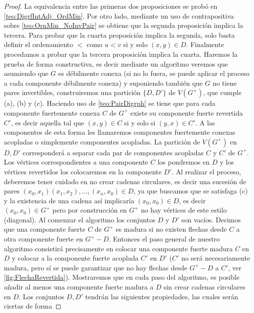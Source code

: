 \begin{proof}
  La equivalencia entre las primeras dos proposiciones se prob\'o en
  \cref{teo:DigrfIntAdj_OrdMin}. Por otro lado, mediante un uso de
  contrapositiva sobre \cref{teo:OrnMin_NoInvPair} se obtiene que la segunda
  proposici\'on implica la tercera. {\color{malva}Para probar que la cuarta
  proposici\'on implica la segunda, solo basta definir el ordenamiento $<$ como
  $u<v$ si y solo $(x,y) \in D$. } Finalmente procedamos a probar que la tercera
  proposici\'on implica la cuarta. Haremos la prueba de forma constructiva, es
  decir mediante un algoritmo veremos que asumiendo que $G$ es d\'ebilmente
  conexa (si no lo fuera, se puede aplicar el proceso a cada componente
  d\'ebilmente conexa) y suponiendo tambi\'en que $G$ no tiene pares
  invertibles, construiremos una partici\'on $\{D,D'\}$ de $V(G^+)$, que cumple
  (a), (b) y (c). Haciendo uso de \cref{teo:PairDigrph} se tiene que para cada
  componente fuertemente conexa $C$ de $G^+$ existe su componente fuerte
  revertida $C'$, es decir aquella tal que $(x,y)\in C $ si y solo si $(y,x)\in
  C'$. A las componentes de esta forma les llamaremos componentes fuertemente
  conexas acopladas o simplemente componentes acopladas. La partici\'on de
  $V(G^+)$ en $D,D'$ corresponder\'a a separar cada par de componentes acopladas
  $C$ y $C'$ de $G^+$. Los v\'ertices correspondientes a una componente $C$ los
  pondremos en $D$ y los v\'ertices revertidos los colocaremos en la componente
  $D'$. Al realizar el proceso, deberemos tener cuidado en no crear cadenas
  circulares, es decir una sucesi\'on de pares $(x_0,x_1)(x_1,x_2),\dots,
  (x_n,x_0)\in D$, ya que buscamos que se satisfaga (c) y la existencia de una
  cadena así implicaría $(x_0,x_0)\in D$, es decir $(x_0,x_0)\in G^+$ pero por
  construcci\'on en $G^+$ no hay v\'ertices de este estilo (diagonal). Al
  comenzar el algoritmo los conjuntos $D$ y $D'$ son vacíos. Decimos que una
  componente fuerte $C$ de $G^+$ es madura si no existen flechas desde $C$ a
  otra componente fuerte en $G^+ -D$. Entonces el paso general de nuestro
  algoritmo consistir\'a precisamente en colocar una componente fuerte madura
  $C$ en $D$ y colocar a la componente fuerte acoplada $C' $ en $D'$ ($C'$ no
  ser\'a necesariamente madura, pero s\'i se puede garantizar que no hay flechas
  desde $G^+ -D$ a $C'$, ver \cref{fig:FlechaRevertida}). Mostraremos que en
  cada paso del algoritmo, es posible añadir al menos una componente fuerte
  madura a $D$ sin crear cadenas circulares en $D$. Los conjuntos $D,D'$
  tendr\'an las siguientes propiedades, las cuales ser\'an ciertas de forma

\end{proof}
